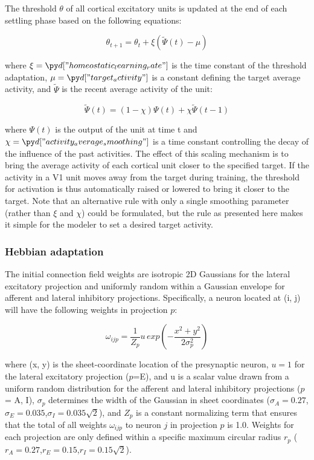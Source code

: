 \documentclass[utf8]{frontiersSCNS}
\begin{document}
The threshold $\theta$ of all cortical excitatory units is updated at the end of each settling phase based on the following 
equations:

\begin{equation}
	\theta_{t+1} = \theta_{t} + \xi (\tilde{\Psi}(t) - \mu) 
\end{equation}

\noindent where $\xi=\insval{homeostatic_learning_rate}$ is the time constant of the threshold adaptation,
$\mu=\insval{target_activity}$ is a constant defining the target average activity, and $\tilde{\Psi}$ is 
the recent average activity of the unit:

\begin{equation}
  \tilde{\Psi}(t) = (1 - \chi)\Psi(t) + \chi\tilde{\Psi}(t-1)  
\end{equation}

\noindent where $\Psi(t)$ is the output of the unit at time t and $\chi=\insval{activity_average_smoothing}$ is a time constant 
controlling the decay of the influence of the past activities. The effect of this scaling mechanism is to bring the average activity of each 
cortical unit closer to the specified target. If the activity in a V1 unit moves away from the target during training, the threshold for activation is thus automatically raised or lowered to bring it closer to the target. Note that an alternative rule with only a single smoothing parameter (rather than
$\xi$ and  $\chi$) could be formulated, but the rule as presented here makes it simple for the modeler to set a desired target activity.

\subsubsection{Hebbian adaptation}

The initial connection field weights are isotropic 2D Gaussians for the lateral excitatory projection and uniformly random within a Gaussian envelope for afferent and lateral inhibitory projections. Specifically, a neuron located at (i, j) will have the following weights in projection $p$:

\begin{equation}
\omega_{ijp} = \frac{1}{Z_{p}} u\, exp(- \frac{x^2+y^2}{2\sigma^2_p} )
\end{equation}

\noindent where (x, y) is the sheet-coordinate location of the presynaptic neuron, $u=1$ for the lateral excitatory projection ($p$=E), and u is a scalar value drawn from a uniform random distribution for the afferent and lateral inhibitory projections ($p$ = A, I),
$\sigma_{p}$ determines the width of the Gaussian in sheet coordinates ($\sigma_{A}=0.27$,$\sigma_{E}=0.035$,$\sigma_{I}=0.035 \sqrt{2}$), 
and $Z_{p}$ is a constant normalizing term that ensures that the total of all weights $\omega_{ijp}$ to neuron $j$ in projection $p$ is 1.0. Weights for each projection are only defined within a specific maximum circular radius $r_p$ ($r_{A}=0.27$,$r_{E}=0.15$,$r_{I}=0.15 \sqrt{2}$).
\end{document}
